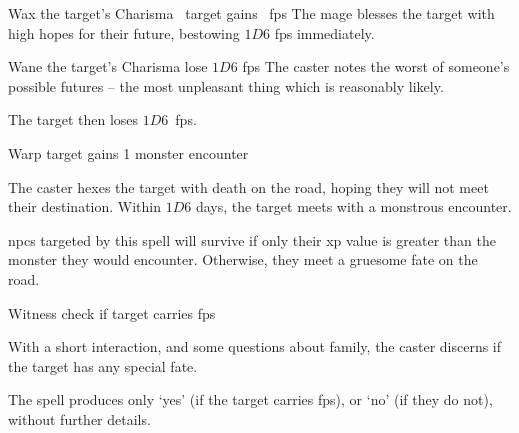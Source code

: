   {\mFate}%
  {Wax}%
  {}%
  {the target's Charisma}%
  {\spellArea~target gains \rollConv~\glspl{fp}}%
  {
    The mage blesses the target with high hopes for their future, bestowing $1D6$ \glspl{fp} immediately.
  }

  {\mFate}%
  {Wane}%
  {}%
  {the target's Charisma}%
  {lose $1D6$ \glspl{fp}}%
  {
    The caster notes the worst of someone's possible futures -- the most unpleasant thing which is reasonably likely.
  }

The target then loses $1D6$~\glspl{fp}.

  {\mFate}%
  {Warp}%
  {}%
  {}%
  {target gains 1 monster encounter}%
  {
    The caster hexes the target with death on the road, hoping they will not meet their destination.
    Within $1D6$ days, the target meets with a monstrous encounter.%

    \Glspl{npc} targeted by this spell will survive if only their \gls{xp} value is greater than the monster they would encounter.
    Otherwise, they meet a gruesome fate on the road.
  }

  {\mFate}%
  {Witness}%
  {}%
  {}%
  {check if target carries \glspl{fp}}%
  {
    With a short interaction, and some questions about family, the caster discerns if the target has any special fate.

    The spell produces only `yes' (if the target carries \glspl{fp}), or `no' (if they do not), without further details.
  }

